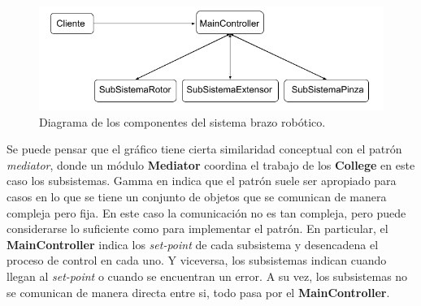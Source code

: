 \begin{figure}[h]
\caption{Diagrama de los componentes del sistema brazo robótico.}
\label{diagramaRobotico}
\begin{center}
\includegraphics[scale=0.6]{componentes.png}
\end{center}
\end{figure}



Se puede pensar que el gráfico tiene cierta similaridad conceptual con el patrón \textit{mediator}, donde un módulo \textbf{Mediator} coordina el trabajo de los \textbf{College} en este caso los subsistemas. Gamma en \cite{Gamma:1995:DPE:186897} indica que el patrón suele ser apropiado para casos en lo que se tiene un conjunto de objetos que se comunican de manera compleja pero fija. En este caso la comunicación no es tan compleja, pero puede considerarse lo suficiente como para implementar el patrón. En particular, el \textbf{MainController} indica los \textit{set-point} de cada subsistema y desencadena el proceso de control en cada uno. Y viceversa, los subsistemas indican cuando llegan al \textit{set-point} o cuando se encuentran un error. A su vez, los subsistemas no se comunican de manera directa entre si, todo pasa por el \textbf{MainController}.

